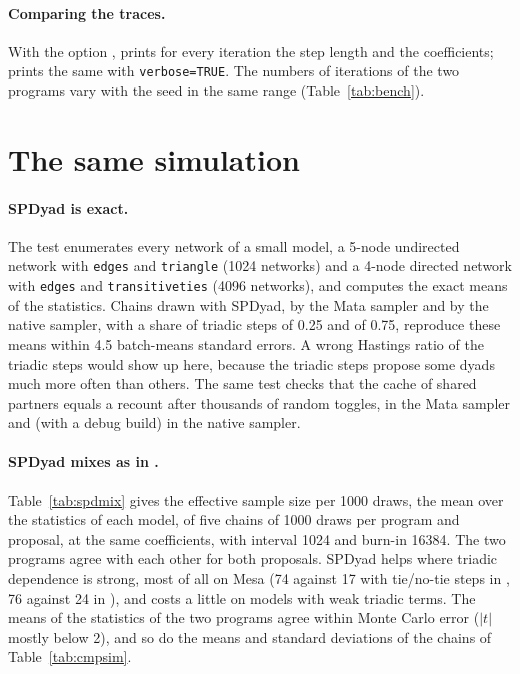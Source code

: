 \paragraph{Comparing the traces.} With the option , \nwergm{} prints for every iteration the step length and the coefficients; \ergm{} prints the same with \texttt{verbose=TRUE}. The numbers of iterations of the two programs vary with the seed in the same range (Table~\ref{tab:bench}).

\section{The same simulation}\label{sec:samest-sim}

\paragraph{SPDyad is exact.} The test enumerates every network of a small model, a 5-node undirected network with \texttt{edges} and \texttt{triangle} (1024 networks) and a 4-node directed network with \texttt{edges} and \texttt{transitiveties} (4096 networks), and computes the exact means of the statistics. Chains drawn with SPDyad, by the Mata sampler and by the native sampler, with a share of triadic steps of 0.25 and of 0.75, reproduce these means within 4.5 batch-means standard errors. A wrong Hastings ratio of the triadic steps would show up here, because the triadic steps propose some dyads much more often than others. The same test checks that the cache of shared partners equals a recount after thousands of random toggles, in the Mata sampler and (with a debug build) in the native sampler.

\paragraph{SPDyad mixes as in \ergm{}.} Table~\ref{tab:spdmix} gives the effective sample size per 1000 draws, the mean over the statistics of each model, of five chains of 1000 draws per program and proposal, at the same coefficients, with interval 1024 and burn-in 16384. The two programs agree with each other for both proposals. SPDyad helps where triadic dependence is strong, most of all on Mesa (74 against 17 with tie/no-tie steps in \nwergm{}, 76 against 24 in \ergm{}), and costs a little on models with weak triadic terms. The means of the statistics of the two programs agree within Monte Carlo error ($|t|$ mostly below 2), and so do the means and standard deviations of the chains of Table~\ref{tab:cmpsim}.

